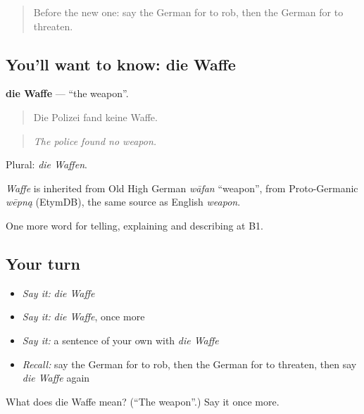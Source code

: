 \label{lesson:GE-C282-waffe}



\begin{quote}
Before the new one: say the German for to rob, then the German for to threaten.
\end{quote}

\subsection*{You'll want to know: die Waffe}
\textbf{die Waffe} — \textquotedblleft{}the weapon\textquotedblright{}.

\begin{quote}
Die Polizei fand keine Waffe.
\end{quote}

\begin{quote}
\emph{The police found no weapon.}
\end{quote}

Plural: \emph{die Waffen}.

\begin{cousinweb}
\emph{Waffe} is inherited from Old High German \emph{wāfan} \textquotedblleft{}weapon\textquotedblright{}, from Proto-Germanic \emph{wēpną} (EtymDB), the same source as English \emph{weapon}.
\end{cousinweb}

\begin{grammarlens}[title={What you've built}]
One more word for telling, explaining and describing at B1.
\end{grammarlens}

\subsection*{Your turn}
\begin{itemize}
\raggedright
  \item \emph{Say it:} \emph{die Waffe}
  \item \emph{Say it:} \emph{die Waffe}, once more
  \item \emph{Say it:} a sentence of your own with \emph{die Waffe}
  \item \emph{Recall:} say the German for to rob, then the German for to threaten, then say \emph{die Waffe} again
\end{itemize}

\begin{tcolorbox}[breakable,colback=teal!4,colframe=teal!35!black,title={Before you move on}]
What does die Waffe mean? (\textquotedblleft{}The weapon\textquotedblright{}.) Say it once more.
\end{tcolorbox}
